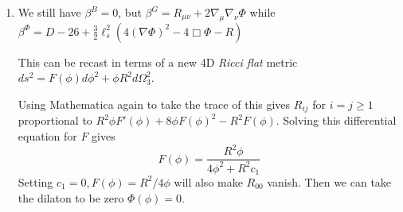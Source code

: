 \documentclass[11pt, class=article, crop=false]{standalone}
\begin{document}
\begin{enumerate}
	Now taking the trace of the first equation implies $R(t) = -2 \Box \Phi(x, t)$. Then the second equation will give:
	\[
		\frac{16}{\ell_s^2} =  4(\nabla \Phi(x, t))^2 - 2 (\Box \Phi)(t)
	\]
	Write the metric as $ds^2 = -dt^2 + a(t)^2 dx^2$, fixing the time reparameterization, and allow $\Phi = f(t) + \alpha x$, since a term linear in $x$ drops out of every equation. The components of $\beta^G$ are
	\[
		tt:\ -\frac{\ddot a}{a} + 2 \ddot f = 0, \qquad xx:\ \ddot a - 2 \dot a \dot f = 0, \qquad tx:\ -2 \alpha \frac{\dot a}{a} = 0,
	\]
	so either the metric is flat or $\alpha = 0$.
	
	\emph{Flat:} $a = 1$, $\ddot f = 0$, so $\Phi = \alpha x + \beta t$ and the dilaton equation gives $4 (\nabla \Phi)^2 = 4(\alpha^2 - \beta^2) = 16/\ell_s^2$, i.e. $\alpha^2 - \beta^2 = 4/\ell_s^2$. The gradient must be spacelike, so $\alpha \neq 0$ and $x$ cannot be compact, while $\beta = 0$ with periodic $t$ is fine. This is the $D = 2$ linear dilaton.
	
	\emph{Curved:} $\alpha = 0$. The two $\beta^G$ equations give $\ddot f = (\dot a/a) \dot f$, hence $\dot f = k a$, and $\ddot a = 2 \dot a \dot f$. The combination $4 \ddot f - 2 \ddot a/a$ then vanishes in the dilaton equation, which reduces to $\dot f (\dot a/a - \dot f) = 4/\ell_s^2$, i.e. $\dot a = k a^2 + 4/(k \ell_s^2)$. This is solved by $a = \frac{2}{k \ell_s} \tan(2t/\ell_s)$, and rescaling $x$ to absorb the constant,
	\[
		ds^2 = -dt^2 + \tan^2\!\left(\frac{2t}{\ell_s}\right) dx^2, \qquad \Phi = -\log\left|\cos \frac{2t}{\ell_s}\right|,
	\]
	with $R = \frac{16}{\ell_s^2} \sec^2(2t/\ell_s) \neq 0$, so $R = \Box \Phi = 0$ is not forced. This is the Lorentzian continuation of the two-dimensional black hole (the $\SL(2, \RR)/U(1)$ cigar $ds^2 = dr^2 + \tanh^2 r\, dx^2$, $\Phi = -\log \cosh r$), in the region where the Killing vector $\d_x$ is spacelike. Up to translations of $t$ and $x$, these two branches are all the solutions.
	
	\item We still have $\beta^B = 0$, but $\beta^{G} = R_{\mu \nu} + 2 \nabla_{\mu} \nabla_{\nu} \Phi$ while $\beta^\Phi = D - 26 +  \frac32 \ell_s^2 ( 4 (\nabla \Phi)^2 - 4 \Box \Phi - R)$
	
	This can be recast in terms of a new 4D \emph{Ricci flat} metric $ds^2 = F(\phi) d\phi^2 + \phi R^2 d\Omega_3^2$. 
	
	Using Mathematica again to take the trace of this gives $R_{ij}$ for $i=j\geq 1$ proportional to $R^2 \phi F'(\phi) + 8 \phi F(\phi)^2 - R^2 F(\phi)$. Solving this differential equation for $F$ gives
	\[
		F(\phi) = \frac{R^2 \phi}{4 \phi^2 + R^2 c_1}
	\]
	Setting $c_1 = 0, F(\phi) = R^2 / 4 \phi$ will also make $R_{00}$ vanish. Then we can take the dilaton to be zero $\Phi(\phi) = 0$.
	

\end{enumerate}
\end{document}
